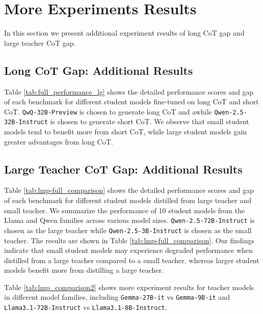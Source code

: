 \section{More Experiments Results}
\label{appendix: More Experiments}
In this section we present additional experiment results of long CoT gap and large teacher CoT gap.
\subsection{Long CoT Gap: Additional Results}
Table \ref{tab:full_performance_lg} shows the detailed performance scores and gap of each benchmark for different student models fine-tuned on long CoT and short CoT.
\texttt{QwQ-32B-Preview} is chosen to generate long CoT and awhile \texttt{Qwen-2.5-32B-Instruct} is chosen to generate short CoT. We observe that small student models tend to benefit more from short CoT, while large student models gain greater advantages from long CoT. 

\subsection{Large Teacher CoT Gap: Additional Results}
Table \ref{tab:lmp-full_comparison} shows the detailed performance scores and gap of each benchmark for different student models distilled from large teacher and small teacher.
We summarize the performance of 10 student models from the Llama and Qwen families across various model sizes. \texttt{Qwen-2.5-72B-Instruct} is chosen as the large teacher while \texttt{Qwen-2.5-3B-Instruct} is chosen as the small teacher. The results are shown in Table \ref{tab:lmp-full_comparison}. Our findings indicate that small student models may experience degraded performance when distilled from a large teacher compared to a small teacher, whereas larger student models benefit more from distilling a large teacher.

Table \ref{tab:lmp_comparison2} shows more experiment results for teacher models in different model families, including \texttt{Gemma-27B-it} vs \texttt{Gemma-9B-it} and \texttt{Llama3.1-72B-Instruct} vs \texttt{Llama3.1-8B-Instruct}. 


